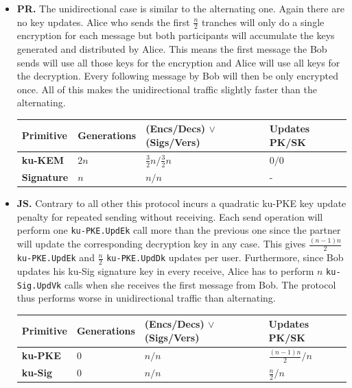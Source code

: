 \documentclass[11pt,a4paper,twoside,openright,bibliography=totoc]{scrbook}
\begin{document}
\begin{itemize}
\item \textbf{PR.} The unidirectional case is similar to the alternating
  one. Again there are no key updates. Alice who sends the first
  $\frac{n}{2}$ tranches will only do a single encryption for
  each message but both participants will accumulate the keys
  generated and distributed by Alice. This means the first
  message the Bob sends will use all those keys for the encryption
  and Alice will use all keys for the decryption. Every following
  message by Bob will then be only encrypted once. All of this
  makes the unidirectional traffic slightly faster than the alternating.
  \begin{center}
    \begin{tabular}{ | l | l | l | l |}
    \hline
    Primitive & Generations & (Encs/Decs) $\vee$ (Sigs/Vers) & Updates PK/SK \\ \hline
    \textbf{ku-KEM} & $2n$ & $\frac{3}{2}n/\frac{3}{2}n$ & $0/0$ \\ \hline
    \textbf{Signature} & $n$ & $n/n$ & - \\  
    \hline
    \end{tabular}
  \end{center}
\item  \textbf{JS.} Contrary to all other this protocol incurs a
  quadratic ku-PKE key update penalty for repeated sending without receiving.
  Each send operation will perform one \texttt{ku-PKE.UpdEk} call more than the previous
  one since the partner will update the corresponding decryption key
  in any case. This gives $\frac{(n-1)n}{2}$ \texttt{ku-PKE.UpdEk} and
  $\frac{n}{2}$ \texttt{ku-PKE.UpdDk} updates per user. Furthermore,
  since Bob updates his ku-Sig signature key in every receive, Alice
  has to perform $n$ \texttt{ku-Sig.UpdVk} calls when she receives the
  first message from Bob. The protocol thus performs worse in unidirectional
  traffic than alternating.
  \begin{center}
    \begin{tabular}{ | l | l | l | l |}
    \hline
    Primitive & Generations & (Encs/Decs) $\vee$ (Sigs/Vers) & Updates PK/SK \\ \hline
    \textbf{ku-PKE} & $0$ & $n/n$ & $\frac{(n-1)n}{2}/n$ \\ \hline
    \textbf{ku-Sig} & $0$ & $n/n$ & $\frac{n}{2}/n$ \\  
    \hline
    \end{tabular}
  \end{center}

\end{itemize}
\end{document}
